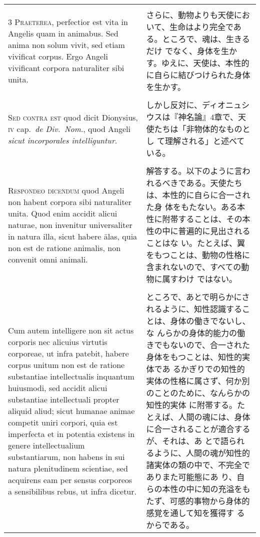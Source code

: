 \documentclass[10pt]{jsarticle} %
\begin{document}
\begin{longtable}{p{21em}p{21em}}
\\\\


{\scshape 3 Praeterea}, perfectior est vita in Angelis quam in animabus. Sed
anima non solum vivit, sed etiam vivificat corpus. Ergo Angeli vivificant
corpora naturaliter sibi unita.


&

さらに、動物よりも天使において、生命はより完全である。ところで、魂は、生きるだけ
でなく、身体を生かす。ゆえに、天使は、本性的に自らに結びつけられた身体を生かす。

\\\\


{\scshape Sed contra est} quod dicit Dionysius, {\scshape iv} cap.~{\itshape de
Div.~Nom}., quod Angeli {\itshape sicut incorporales intelliguntur}.


&

しかし反対に、ディオニュシウスは『神名論』4章で、天使たちは「非物体的なものとし
て理解される」と述べている。


\\\\


{\scshape Respondeo dicendum} quod Angeli non habent corpora sibi naturaliter
unita. Quod enim accidit alicui naturae, non invenitur universaliter in natura
illa, sicut habere \={a}las, quia non est de ratione animalis, non convenit omni
animali.


&

解答する。以下のように言われるべきである。天使たちは、本性的に自らに合一された身
体をもたない。ある本性に附帯することは、その本性の中に普遍的に見出されることはな
い。たとえば、翼をもつことは、動物の性格に含まれないので、すべての動物に属すわけ
ではない。

\\\\

Cum autem intelligere non sit actus corporis nec alicuius virtutis corporeae, ut
infra patebit, habere corpus unitum non est de ratione substantiae
intellectualis inquantum huiusmodi, sed accidit alicui substantiae intellectuali
propter aliquid aliud; sicut humanae animae competit uniri corpori, quia est
imperfecta et in potentia existens in genere intellectualium substantiarum, non
habens in sui natura plenitudinem scientiae, sed acquirens eam per sensus
corporeos a sensibilibus rebus, ut infra dicetur.


&

ところで、あとで明らかにされるように、知性認識することは、身体の働きでないし、な
んらかの身体的能力の働きでもないので、合一された身体をもつことは、知性的実体であ
るかぎりでの知性的実体の性格に属さず、何か別のことのために、なんらかの知性的実体
に附帯する。たとえば、人間の魂には、身体に合一されることが適合するが、それは、あ
とで語られるように、人間の魂が知性的諸実体の類の中で、不完全でありまた可能態にあ
り、自らの本性の中に知の充溢をもたず、可感的事物から身体的感覚を通して知を獲得す
るからである。



\end{longtable}
\end{document}
